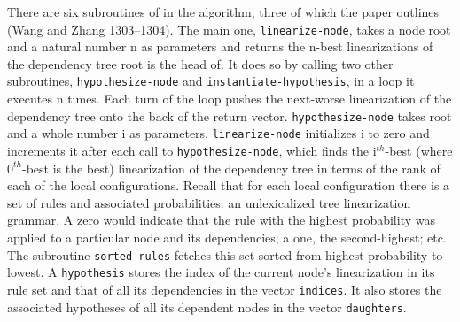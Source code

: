 \documentclass[12pt,letterpaper]{article}
\begin{document}
\begin{flushleft}
  There are six subroutines of in the algorithm, three of which the paper outlines (Wang and Zhang 1303--1304). The main one, \texttt{linearize-node}, takes a node $\textrm{root}$ and a natural number $\textrm{n}$ as parameters and returns the $\textrm{n}$-best linearizations of the dependency tree $\textrm{root}$ is the head of. It does so by calling two other subroutines, \texttt{hypothesize-node} and \texttt{instantiate-hypothesis}, in a loop it executes $\textrm{n}$ times. Each turn of the loop pushes the next-worse linearization of the dependency tree onto the back of the return vector. \texttt{hypothesize-node} takes $\textrm{root}$ and a whole number $\textrm{i}$ as parameters. \texttt{linearize-node} initializes $\textrm{i}$ to zero and increments it after each call to \texttt{hypothesize-node}, which finds the $\textrm{i}^{th}$-best (where $0^{th}$-best is the best) linearization of the dependency tree in terms of the rank of each of the local configurations. Recall that for each local configuration there is a set of rules and associated probabilities: an unlexicalized tree linearization grammar. A zero would indicate that the rule with the highest probability was applied to a particular node and its dependencies; a one, the second-highest; etc. The subroutine \texttt{sorted-rules} fetches this set sorted from highest probability to lowest. A \texttt{hypothesis} stores the index of the current node's linearization in its rule set and that of all its dependencies in the vector \texttt{indices}. It also stores the associated hypotheses of all its dependent nodes in the vector \texttt{daughters}.


\end{flushleft}
\end{document}
